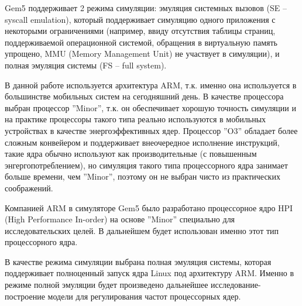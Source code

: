     Gem5 поддерживает 2 режима симуляции: эмуляция системных вызовов (SE -- syscall emulation), который
    поддерживает симуляцию одного приложения с некоторыми ограничениями (например, ввиду отсутствия таблицы
    страниц, поддерживаемой операционной системой, обращения в виртуальную память упрощено, MMU (Memory
    Management Unit) не участвует в симуляции), и полная эмуляция системы (FS -- full system).

    В данной работе используется архитектура ARM, т.к. именно она используется в большинстве мобильных
    систем на сегодняшний день. В качестве процессора выбран процессор ''Minor'', т.к. он обеспечивает
    хорошую точность симуляции и на практике процессоры такого типа реально используются в мобильных
    устройствах в качестве энергоэффективных ядер. Процессор ''O3'' обладает более сложным конвейером и
    поддерживает внеочередное исполнение инструкций, такие ядра обычно используют как производительные
    (с повышенным энгергопотреблением), но симуляция такого типа процессорного ядра занимает больше
    времени, чем ''Minor'', поэтому он не выбран чисто из практических соображений.

    Компанией ARM в симуляторе Gem5 было разработано процессорное ядро HPI (High Performance In-order)
    \cite{gem52017HPI} на основе ''Minor'' специально для исследовательских целей. В дальнейшем
    будет использован именно этот тип процессорного ядра.

    В качестве режима симуляции выбрана полная эмуляция системы, которая поддерживает полноценный запуск
    ядра Linux под архитектуру ARM. Именно в режиме полной эмуляции будет произведено дальнейшее
    исследование-построение модели для регулирования частот процессорных ядер.


\newpage
